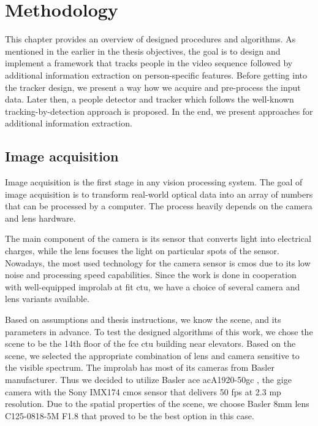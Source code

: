 \chapter{Methodology}
    This chapter provides an overview of designed procedures and algorithms. As mentioned in the earlier in the thesis objectives, the goal is to design and implement a framework that tracks people in the video sequence followed by additional information extraction on person-specific features. Before getting into the tracker design, we present a way how we acquire and pre-process the input data. Later then, a people detector and tracker which follows the well-known tracking-by-detection approach is proposed. In the end, we present approaches for additional information extraction. 

\section{Image acquisition}
    Image acquisition is the first stage in any vision processing system. The goal of image acquisition is to transform real-world optical data into an array of numbers that can be processed by a computer. The process heavily depends on the camera and lens hardware. 
    
    The main component of the camera is its sensor that converts light into electrical charges, while the lens focuses the light on particular spots of the sensor. Nowadays, the most used technology for the camera sensor is \gls{cmos} due to its low noise and processing speed capabilities. Since the work is done in cooperation with well-equipped \gls{improlab} at \gls{fit} \gls{ctu}, we have a choice of several camera and lens variants available.
    
    Based on assumptions and thesis instructions, we know the scene, and its parameters in advance. To test the designed algorithms of this work, we chose the scene to be the 14th floor of the \gls{fce} \gls{ctu} building near elevators. Based on the scene, we selected the appropriate combination of lens and camera sensitive to the visible spectrum. The \gls{improlab} has most of its cameras from Basler manufacturer. Thus we decided to utilize Basler ace acA1920-50gc \cite{baslercamera}, the \gls{gige} camera with the Sony IMX174 \gls{cmos} sensor that delivers 50 \gls{fps} at 2.3 \gls{mp} resolution. Due to the spatial properties of the scene, we choose Basler 8mm lens C125-0818-5M F1.8 \cite{baslerlens} that proved to be the best option in this case.
    
